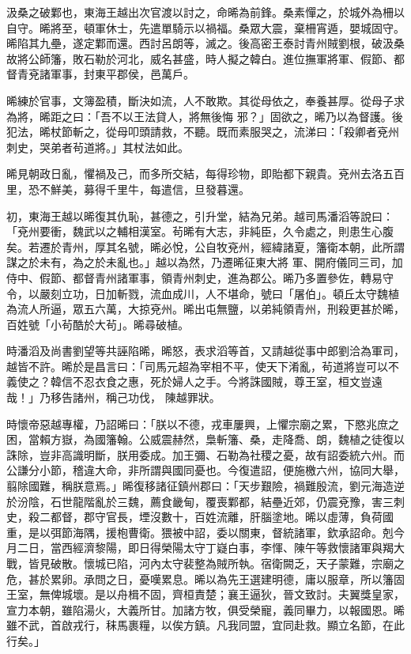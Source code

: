 \begin{pinyinscope}
 汲桑之破鄴也，東海王越出次官渡以討之，命晞為前鋒。桑素憚之，於城外為柵以自守。晞將至，頓軍休士，先遣單騎示以禍福。桑眾大震，棄柵宵遁，嬰城固守。晞陷其九壘，遂定鄴而還。西討呂朗等，滅之。後高密王泰討青州賊劉根，破汲桑故將公師籓，敗石勒於河北，威名甚盛，時人擬之韓白。進位撫軍將軍、假節、都督青兗諸軍事，封東平郡侯，邑萬戶。



 晞練於官事，文簿盈積，斷決如流，人不敢欺。其從母依之，奉養甚厚。從母子求為將，晞距之曰：「吾不以王法貸人，將無後悔
 邪？」固欲之，晞乃以為督護。後犯法，晞杖節斬之，從母叩頭請救，不聽。既而素服哭之，流涕曰：「殺卿者兗州刺史，哭弟者茍道將。」其杖法如此。



 晞見朝政日亂，懼禍及己，而多所交結，每得珍物，即貽都下親貴。兗州去洛五百里，恐不鮮美，募得千里牛，每遣信，旦發暮還。



 初，東海王越以晞復其仇恥，甚德之，引升堂，結為兄弟。越司馬潘滔等說曰：「兗州要衝，魏武以之輔相漢室。茍晞有大志，非純臣，久令處之，則患生心腹矣。若遷於青州，厚其名號，晞必悅，公自牧兗州，經緯諸夏，籓衛本朝，此所謂謀之於未有，為之於未亂也。」越以為然，乃遷晞征東大將
 軍、開府儀同三司，加侍中、假節、都督青州諸軍事，領青州刺史，進為郡公。晞乃多置參佐，轉易守令，以嚴刻立功，日加斬戮，流血成川，人不堪命，號曰「屠伯」。頓丘太守魏植為流人所逼，眾五六萬，大掠兗州。晞出屯無鹽，以弟純領青州，刑殺更甚於晞，百姓號「小茍酷於大茍」。晞尋破植。



 時潘滔及尚書劉望等共誣陷晞，晞怒，表求滔等首，又請越從事中郎劉洽為軍司，越皆不許。晞於是昌言曰：「司馬元超為宰相不平，使天下淆亂，茍道將豈可以不義使之？韓信不忍衣食之惠，死於婦人之手。今將誅國賊，尊王室，桓文豈遠哉！」乃移告諸州，稱己功伐，
 陳越罪狀。



 時懷帝惡越專權，乃詔晞曰：「朕以不德，戎車屢興，上懼宗廟之累，下愍兆庶之困，當賴方嶽，為國籓翰。公威震赫然，梟斬籓、桑，走降喬、朗，魏植之徒復以誅除，豈非高識明斷，朕用委成。加王彌、石勒為社稷之憂，故有詔委統六州。而公謙分小節，稽違大命，非所謂與國同憂也。今復遣詔，便施檄六州，協同大舉，翦除國難，稱朕意焉。」晞復移諸征鎮州郡曰：「天步艱險，禍難殷流，劉元海造逆於汾陰，石世龍階亂於三魏，薦食畿甸，覆喪鄴都，結壘近郊，仍震兗豫，害三刺史，殺二都督，郡守官長，堙沒數十，百姓流離，肝腦塗地。晞以虛薄，負荷國
 重，是以弭節海隅，援枹曹衛。猥被中詔，委以關東，督統諸軍，欽承詔命。剋今月二日，當西經濟黎陽，即日得榮陽太守丁嶷白事，李惲、陳午等救懷諸軍與羯大戰，皆見破散。懷城已陷，河內太守裴整為賊所執。宿衛闕乏，天子蒙難，宗廟之危，甚於累卵。承問之日，憂嘆累息。晞以為先王選建明德，庸以服章，所以籓固王室，無俾城壞。是以舟楫不固，齊桓責楚；襄王逼狄，晉文致討。夫翼獎皇家，宣力本朝，雖陷湯火，大義所甘。加諸方牧，俱受榮寵，義同畢力，以報國恩。晞雖不武，首啟戎行，秣馬裹糧，以俟方鎮。凡我同盟，宜同赴救。顯立名節，在此行矣。」




\end{pinyinscope}
